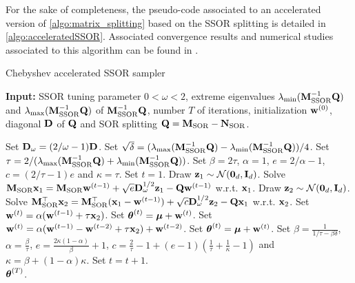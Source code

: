 \documentclass[nohypdvips,onefignum,onetabnum]{siamart171218}
\begin{document}
For the sake of completeness, the pseudo-code associated to an accelerated version of \cref{algo:matrix_splitting} based on the SSOR splitting is detailed in \cref{algo:acceleratedSSOR}.
Associated convergence results and numerical studies associated to this algorithm can be found in \cite{FoxParker14,Fox2017}.
%
\begin{algorithm}
\caption{Chebyshev accelerated SSOR sampler}
\label{algo:acceleratedSSOR}
\hspace*{\algorithmicindent} \textbf{Input:} SSOR tuning parameter $0<\omega<2$, extreme eigenvalues $\lambda_{\mathrm{min}}(\mathbf{M}^{-1}_{\mathrm{SSOR}}\mathbf{Q})$ and $\lambda_{\mathrm{max}}(\mathbf{M}^{-1}_{\mathrm{SSOR}}\mathbf{Q})$ of $\mathbf{M}^{-1}_{\mathrm{SSOR}}\mathbf{Q}$, number $T$ of iterations, initialization $\mathbf{w}^{(0)}$, diagonal $\mathbf{D}$ of $\mathbf{Q}$ and SOR splitting $\mathbf{Q} = \mathbf{M}_{\mathrm{SOR}} - \mathbf{N}_{\mathrm{SOR}}$.
\begin{algorithmic}[1]
\State Set $\mathbf{D}_{\omega} = (2/\omega-1)\mathbf{D}$.
\State Set $\sqrt{\delta}=(\lambda_{\mathrm{max}}(\mathbf{M}^{-1}_{\mathrm{SSOR}}\mathbf{Q})-\lambda_{\mathrm{min}}(\mathbf{M}^{-1}_{\mathrm{SSOR}}\mathbf{Q}))/4$.
\State Set $\tau = 2/(\lambda_{\mathrm{max}}(\mathbf{M}^{-1}_{\mathrm{SSOR}}\mathbf{Q})+\lambda_{\mathrm{min}}(\mathbf{M}^{-1}_{\mathrm{SSOR}}\mathbf{Q}))$.
\State Set $\beta=2\tau$, $\alpha=1$, $e = 2/\alpha - 1$, $c=(2/\tau-1)e$ and $\kappa=\tau$. 
\State Set $t=1$.
  \State Draw $\mathbf{z}_1 \sim \mathcal{N}(\mathbf{0}_d,\mathbf{I}_d)$.
  \State Solve $\mathbf{M}_{\mathrm{SOR}}\mathbf{x}_1 = \mathbf{M}_{\mathrm{SOR}}\mathbf{w}^{(t-1)} + \sqrt{e}\mathbf{D}_{\omega}^{1/2}\mathbf{z}_1 - \mathbf{Q}\mathbf{w}^{(t-1)}$ w.r.t. $\mathbf{x}_1$.
  \State Draw $\mathbf{z}_2 \sim \mathcal{N}(\mathbf{0}_d,\mathbf{I}_d)$.
  \State Solve $\mathbf{M}_{\mathrm{SOR}}^{\top}\mathbf{x}_2 = \mathbf{M}_{\mathrm{SOR}}^{\top}(\mathbf{x}_1-\mathbf{w}^{(t-1)}) + \sqrt{c}\mathbf{D}_{\omega}^{1/2}\mathbf{z}_2 - \mathbf{Q}\mathbf{x}_1$ w.r.t. $\mathbf{x}_2$.
    \State Set $\mathbf{w}^{(t)} = \alpha(\mathbf{w}^{(t-1)} + \tau \mathbf{x}_2)$.
    \State Set $\boldsymbol{\theta}^{(t)} = \boldsymbol{\mu} + \mathbf{w}^{(t)}$.
  \Else
    \State Set $\mathbf{w}^{(t)} = \alpha(\mathbf{w}^{(t-1)} - \mathbf{w}^{(t-2)} + \tau \mathbf{x}_2) + \mathbf{w}^{(t-2)}$.
    \State Set $\boldsymbol{\theta}^{(t)} = \boldsymbol{\mu} + \mathbf{w}^{(t)}$.
 \EndIf
  \State Set $\beta=\frac{1}{1/\tau-\beta\delta}$, $\alpha=\frac{\beta}{\tau}$, $e = \frac{2\kappa(1-\alpha)}{\beta} + 1$, $c=\frac{2}{\tau}-1 + (e-1)(\frac{1}{\tau}+\frac{1}{\kappa}-1)$ and $\kappa = \beta + (1-\alpha)\kappa$. 
  \State Set $t = t + 1$.
\EndWhile\\
\Return $\boldsymbol{\theta}^{(T)}$.
\end{algorithmic}
\end{algorithm}
%
\end{document}
